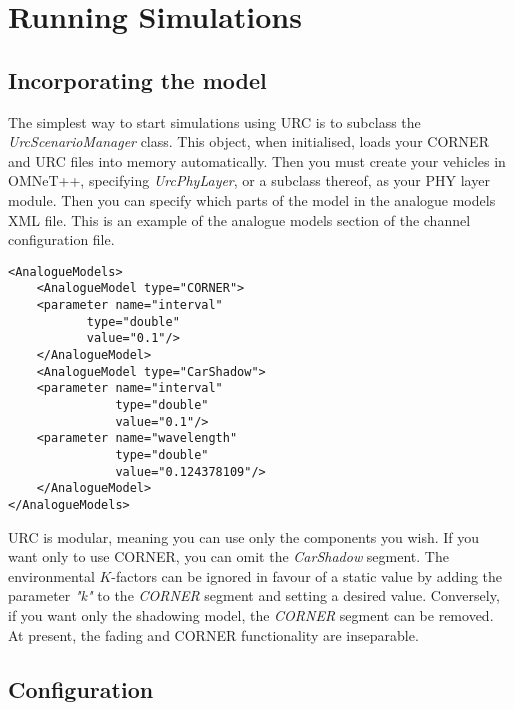 \section{Running Simulations}

\subsection{Incorporating the model}
The simplest way to start simulations using URC is to subclass the \textit{UrcScenarioManager} class. This object, when initialised, loads your CORNER and URC files into memory automatically. Then you must create your vehicles in OMNeT++, specifying \textit{UrcPhyLayer}, or a subclass thereof, as your PHY layer module. Then you can specify which parts of the model in the analogue models XML file. This is an example of the analogue models section of the channel configuration file.

\begin{lstlisting}[frame=single]
<AnalogueModels>
    <AnalogueModel type="CORNER">
	<parameter name="interval"
		   type="double"
		   value="0.1"/>
    </AnalogueModel>
    <AnalogueModel type="CarShadow">
	<parameter name="interval"
	           type="double"
	           value="0.1"/>
	<parameter name="wavelength"
	           type="double" 
	           value="0.124378109"/>
    </AnalogueModel>
</AnalogueModels>
\end{lstlisting}

URC is modular, meaning you can use only the components you wish. If you want only to use CORNER, you can omit the \textit{CarShadow} segment. The environmental $K$-factors can be ignored in favour of a static value by adding the parameter \textit{"k"} to the \textit{CORNER} segment and setting a desired value. Conversely, if you want only the shadowing model, the \textit{CORNER} segment can be removed. At present, the fading and CORNER functionality are inseparable.

\subsection{Configuration}


